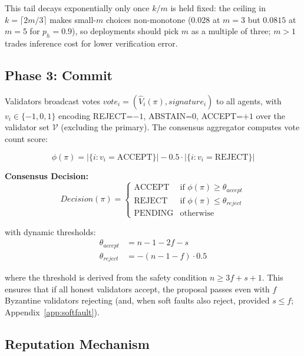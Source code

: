 \documentclass{article}
\begin{document}
This tail decays exponentially only once $k/m$ is held fixed: the ceiling in $k = \lceil 2m/3\rceil$ makes small-$m$ choices non-monotone ($0.028$ at $m{=}3$ but $0.0815$ at $m{=}5$ for $p_h = 0.9$), so deployments should pick $m$ as a multiple of three; $m > 1$ trades inference cost for lower verification error.

\subsection{Phase 3: Commit}

Validators broadcast votes $vote_i = (\hat{V}_i(\pi), signature_i)$ to all agents, with $v_i \in \{-1, 0, 1\}$ encoding REJECT=$-1$, ABSTAIN=$0$, ACCEPT=$+1$ over the validator set $\mathcal{V}$ (excluding the primary). The consensus aggregator computes vote count score:

\begin{equation}
    \phi(\pi) = |\{i : v_i = \text{ACCEPT}\}| - 0.5 \cdot |\{i : v_i = \text{REJECT}\}|
\label{eq:commit}
\end{equation}

\textbf{Consensus Decision:}
\begin{equation}
\label{eq:decision}
    Decision(\pi) = \begin{cases}
        \text{ACCEPT} & \text{if } \phi(\pi) \geq \theta_{accept} \\
        \text{REJECT} & \text{if } \phi(\pi) \leq \theta_{reject} \\
        \text{PENDING} & \text{otherwise}
    \end{cases}
\end{equation}

with dynamic thresholds:
\begin{align}
    \theta_{accept} &= n - 1 - 2f - s \\
    \theta_{reject} &= -(n - 1 - f) \cdot 0.5
\end{align}

where the threshold is derived from the safety condition $n \geq 3f + s + 1$. This ensures that if all honest validators accept, the proposal passes even with $f$ Byzantine validators rejecting (and, when soft faults also reject, provided $s \leq f$; Appendix~\ref{app:softfault}).

\subsection{Reputation Mechanism}
\label{sec:reputation}
\end{document}
